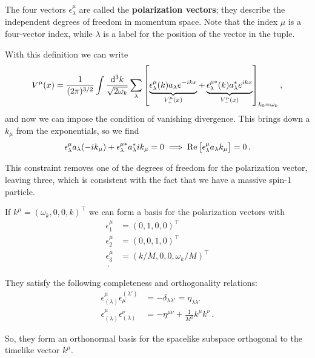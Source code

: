 \documentclass[main.tex]{subfiles}
\begin{document}
The four vectors \(\epsilon^{\mu }_{\lambda }\) are called the \textbf{polarization vectors}; they describe the independent degrees of freedom in momentum space. Note that the index \(\mu \) is a four-vector index, while \(\lambda \) is a label for the position of the vector in the tuple. 

With this definition we can write 
%
\begin{align}
V^{\mu } (x) = \frac{1}{(2 \pi )^{3/2}}
\int 
\frac{ \dd[3]{k}}{\sqrt{2 \omega_{k}}}
\sum _{\lambda } \qty[
\underbrace{\epsilon^{\mu }_{\lambda }(k) a_\lambda e^{-ikx}}_{V_{+}^{\mu }(x)}
+
\underbrace{\epsilon^{\mu *}_{\lambda } (k) a_\lambda^{*} e^{ikx}}_{V_{-}^{\mu }(x)}
]_{k_0 = \omega_{k}}
\,,
\end{align}
%
and now we can impose the condition of vanishing divergence. This brings down a \(k_{\mu }\) from the exponentials, so we find 
%
\begin{align}
\epsilon^{\mu }_{\lambda } a_{\lambda } (-i k_\mu ) + \epsilon^{\mu *}_{\lambda } a^{*}_{\lambda } i k_\mu = 0 \implies \Re \qty[\epsilon^{\mu }_{\lambda } a_{\lambda } k_\mu ] = 0
\,.
\end{align}


This constraint removes one of the degrees of freedom for the polarization vector, leaving three, which is consistent with the fact that we have a massive spin-1 particle. 

\begin{claim}
If \(k^{\mu } = (\omega_{k}, 0, 0, k)^{\top}\) we can form a basis for the polarization vectors with 
%
\begin{subequations}
\begin{align}
\epsilon^{\mu }_{1} &= (0, 1, 0, 0)^{\top}  \\
\epsilon^{\mu }_{2} &= (0, 0, 1, 0)^{\top}  \\
\epsilon^{\mu }_{3} &= (k/M, 0, 0 , \omega_{k} / M)^{\top}  \\
\,.
\end{align}
\end{subequations}

They satisfy the following completeness and orthogonality relations: 
%
\begin{subequations}
\begin{align}
\epsilon^{\mu }_{ (\lambda )} \epsilon^{(\lambda' )}_{\mu } &= - \delta_{\lambda \lambda '} = \eta_{\lambda \lambda '} \\
\epsilon^{\mu }_{(\lambda )} \epsilon^{\nu }_{(\lambda )} &= -\eta^{\mu \nu } + \frac{1}{M^2} k^{\mu } k^{\nu }
\,.
\end{align}
\end{subequations}

So, they form an orthonormal basis for the spacelike subspace orthogonal to the timelike vector \(k^{\mu }\). 
\end{claim}
\end{document}
